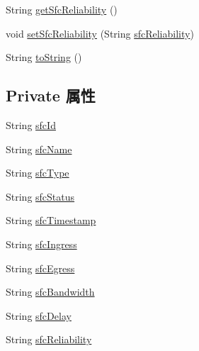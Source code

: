 \begin{DoxyCompactItemize}
\item 
String \mbox{\hyperlink{classcom_1_1example_1_1demo_1_1modular_1_1_sfc_a6bee6df3958f396ffb441c9be03b61fd}{get\+Sfc\+Reliability}} ()
\item 
void \mbox{\hyperlink{classcom_1_1example_1_1demo_1_1modular_1_1_sfc_a9d7eab182b159ff79552f6e701d0a59a}{set\+Sfc\+Reliability}} (String \mbox{\hyperlink{classcom_1_1example_1_1demo_1_1modular_1_1_sfc_a7979940d0a89b6111782fbfe339c84a0}{sfc\+Reliability}})
\item 
String \mbox{\hyperlink{classcom_1_1example_1_1demo_1_1modular_1_1_sfc_a3b66567c1e081475fce714cc4f7019ce}{to\+String}} ()
\end{DoxyCompactItemize}
\subsection*{Private 属性}
\begin{DoxyCompactItemize}
\item 
String \mbox{\hyperlink{classcom_1_1example_1_1demo_1_1modular_1_1_sfc_aba8e4759cfedf074527ff6d7c6dba30f}{sfc\+Id}}
\item 
String \mbox{\hyperlink{classcom_1_1example_1_1demo_1_1modular_1_1_sfc_a85b084e096b77104d6aa0e95cd4bd0f1}{sfc\+Name}}
\item 
String \mbox{\hyperlink{classcom_1_1example_1_1demo_1_1modular_1_1_sfc_a5c4b85dd7191b225e0de4a9b54d09400}{sfc\+Type}}
\item 
String \mbox{\hyperlink{classcom_1_1example_1_1demo_1_1modular_1_1_sfc_aef4582f35cc35919c5384cdee5c20c32}{sfc\+Status}}
\item 
String \mbox{\hyperlink{classcom_1_1example_1_1demo_1_1modular_1_1_sfc_ad08b3121bf8fb27334db93307b052824}{sfc\+Timestamp}}
\item 
String \mbox{\hyperlink{classcom_1_1example_1_1demo_1_1modular_1_1_sfc_a56183d5e87ad5eefd0a6bc3a80244c86}{sfc\+Ingress}}
\item 
String \mbox{\hyperlink{classcom_1_1example_1_1demo_1_1modular_1_1_sfc_a399543ab700135a2ab190a508d898ea1}{sfc\+Egress}}
\item 
String \mbox{\hyperlink{classcom_1_1example_1_1demo_1_1modular_1_1_sfc_a57d1d7ebc46372af945f9ddbea5cc063}{sfc\+Bandwidth}}
\item 
String \mbox{\hyperlink{classcom_1_1example_1_1demo_1_1modular_1_1_sfc_a7bfb3b587900390e0e9459a419fafabe}{sfc\+Delay}}
\item 
String \mbox{\hyperlink{classcom_1_1example_1_1demo_1_1modular_1_1_sfc_a7979940d0a89b6111782fbfe339c84a0}{sfc\+Reliability}}
\end{DoxyCompactItemize}


